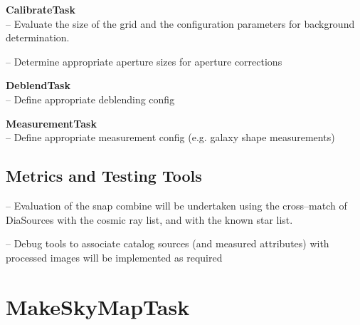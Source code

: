 \documentclass[prd, nofootinbib, floatfix, 11pt,tightenlines,times]{article}
\begin{document}

{\bf CalibrateTask}\\
-- Evaluate the size of the grid and the configuration parameters for background
determination.

-- Determine appropriate  aperture sizes for aperture corrections%

{\bf DeblendTask}\\
-- Define appropriate deblending config


{\bf MeasurementTask}\\
-- Define appropriate measurement config (e.g. galaxy shape measurements)

\subsection{Metrics and Testing Tools}


-- Evaluation of the snap combine will be undertaken using the
cross--match of DiaSources with the cosmic ray list, and with the
known star list.

-- Debug tools to associate catalog sources (and measured attributes)
with processed images will be implemented as required




\section{MakeSkyMapTask} 
\end{document}

